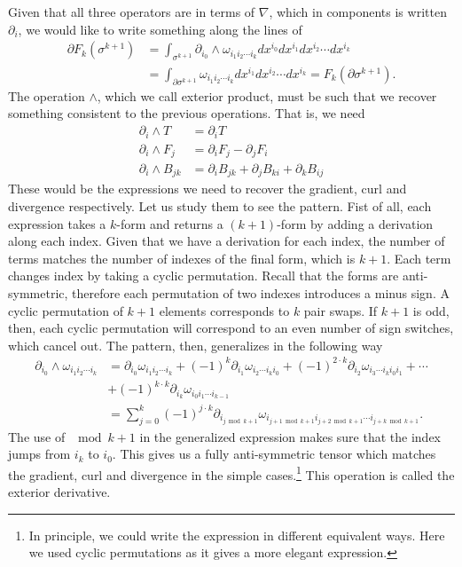 Given that all three operators are in terms of $\nabla$, which in components is written $\partial_i$, we would like to write something along the lines of 
\begin{equation}\label{rp-cm-generalizedStokes}
	\begin{aligned}
		\partial F_k(\sigma^{k+1}) &=\int_{\sigma^{k+1}} \partial_{i_0} \wedge \omega_{i_1 i_2 \cdots i_k} dx^{i_0} dx^{i_1} dx^{i_2} \cdots dx^{i_k} \\
		&= \int_{\partial \sigma^{k+1}} \omega_{i_1 i_2 \cdots i_k} dx^{i_1} dx^{i_2} \cdots dx^{i_k} = F_k(\partial \sigma^{k+1}).
	\end{aligned}
\end{equation}
The operation $\wedge$, which we call exterior product, must be such that we recover something consistent to the previous operations. That is, we need
\begin{equation}
	\begin{aligned}
		\partial_i \wedge T &= \partial_i T \\
		\partial_i \wedge F_j &= \partial_i F_j - \partial_j F_i \\
		\partial_i \wedge B_{jk} &= \partial_{i} B_{jk} + \partial_{j} B_{ki} + \partial_{k} B_{ij} 
	\end{aligned}
\end{equation}
These would be the expressions we need to recover the gradient, curl and divergence respectively. Let us study them to see the pattern. Fist of all, each expression takes a $k$-form and returns a $(k+1)$-form by adding a derivation along each index. Given that we have a derivation for each index, the number of terms matches the number of indexes of the final form, which is $k+1$. Each term changes index by taking a cyclic permutation. Recall that the forms are anti-symmetric, therefore each permutation of two indexes introduces a minus sign. A cyclic permutation of $k+1$ elements corresponds to $k$ pair swaps. If $k+1$ is odd, then, each cyclic permutation will correspond to an even number of sign switches, which cancel out. The pattern, then, generalizes in the following way
\begin{equation}
	\begin{aligned}
		\partial_{i_0} \wedge \omega_{i_1 i_2 \cdots i_k} &= \partial_{i_0} \omega_{i_1 i_2 \cdots i_k} + (-1)^{k} \partial_{i_1} \omega_{i_2 \cdots i_k i_0} + (-1)^{2\cdot k} \partial_{i_2} \omega_{i_3 \cdots i_k i_0 i_1} + \cdots \\
		&+ (-1)^{k\cdot k} \partial_{i_k} \omega_{i_0 i_1 \cdots i_{k-1}} \\
		&= \sum_{j=0}^{k} (-1)^{j\cdot k} \partial_{i_{j \bmod k+1}} \omega_{i_{j+1 \bmod k+1} i_{j+2 \bmod k+1} \cdots i_{j+k \bmod k+1}}.
	\end{aligned}
\end{equation}
The use of $\mod k+1$ in the generalized expression makes sure that the index jumps from $i_k$ to $i_0$. This gives us a fully anti-symmetric tensor which matches the gradient, curl and divergence in the simple cases.\footnote{In principle, we could write the expression in different equivalent ways. Here we used cyclic permutations as it gives a more elegant expression.} This operation is called the exterior derivative.

